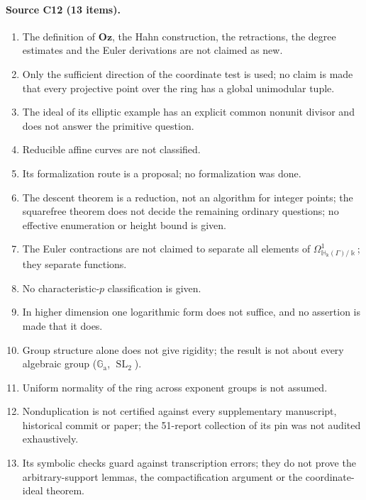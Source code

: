 \documentclass[11pt,oneside]{article}
\numberwithin{equation}{section}
\theoremstyle{definition}
\theoremstyle{remark}
\newcommand{\Oz}{\mathbf{Oz}}
\newcommand{\SL}{\operatorname{SL}}
\newcommand{\crH}{\mathbb H_\Bbbk(\Gamma)}
\newcommand{\Ga}{\mathbb G_{\mathrm a}}
\begin{document}
\paragraph{Source C12 (13 items).}
\begin{enumerate}[leftmargin=*,itemsep=1pt]
\item The definition of $\Oz$, the Hahn construction, the retractions, the degree
estimates and the Euler derivations are not claimed as new.
\item Only the sufficient direction of the coordinate test is used; no claim is made that
every projective point over the ring has a global unimodular tuple.
\item The ideal of its elliptic example has an explicit common nonunit divisor and does
not answer the primitive question.
\item Reducible affine curves are not classified.
\item Its formalization route is a proposal; no formalization was done.
\item The descent theorem is a reduction, not an algorithm for integer points; the
squarefree theorem does not decide the remaining ordinary questions; no effective
enumeration or height bound is given.
\item The Euler contractions are not claimed to separate all elements of
$\Omega^1_{\crH/\Bbbk}$; they separate functions.
\item No characteristic-$p$ classification is given.
\item In higher dimension one logarithmic form does not suffice, and no assertion is made
that it does.
\item Group structure alone does not give rigidity; the result is not about every
algebraic group ($\Ga$, $\SL_2$).
\item Uniform normality of the ring across exponent groups is not assumed.
\item Nonduplication is not certified against every supplementary manuscript, historical
commit or paper; the 51-report collection of its pin was not audited exhaustively.
\item Its symbolic checks guard against transcription errors; they do not prove the
arbitrary-support lemmas, the compactification argument or the coordinate-ideal theorem.
\end{enumerate}
\end{document}
